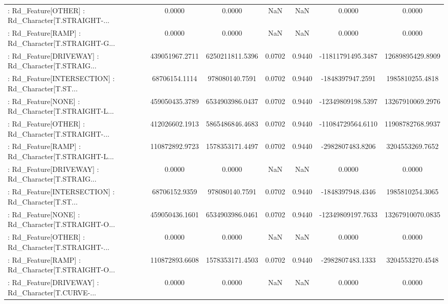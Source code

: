 \begin{longtable}{p{4cm}cccccc}
 : Rd\_Feature[OTHER] : Rd\_Character[T.STRAIGHT-... &            0.0000 &            0.0000 &     NaN &          NaN &             0.0000 &            0.0000 \\
 : Rd\_Feature[RAMP] : Rd\_Character[T.STRAIGHT-G... &            0.0000 &            0.0000 &     NaN &          NaN &             0.0000 &            0.0000 \\
 : Rd\_Feature[DRIVEWAY] : Rd\_Character[T.STRAIG... &    439051967.2711 &   6250211811.5396 &  0.0702 &       0.9440 &  -11811791495.3487 &  12689895429.8909 \\
 : Rd\_Feature[INTERSECTION] : Rd\_Character[T.ST... &     68706154.1114 &    978080140.7591 &  0.0702 &       0.9440 &   -1848397947.2591 &   1985810255.4818 \\
 : Rd\_Feature[NONE] : Rd\_Character[T.STRAIGHT-L... &    459050435.3789 &   6534903986.0437 &  0.0702 &       0.9440 &  -12349809198.5397 &  13267910069.2976 \\
 : Rd\_Feature[OTHER] : Rd\_Character[T.STRAIGHT-... &    412026602.1913 &   5865486846.4683 &  0.0702 &       0.9440 &  -11084729564.6110 &  11908782768.9937 \\
 : Rd\_Feature[RAMP] : Rd\_Character[T.STRAIGHT-L... &    110872892.9723 &   1578353171.4497 &  0.0702 &       0.9440 &   -2982807483.8206 &   3204553269.7652 \\
 : Rd\_Feature[DRIVEWAY] : Rd\_Character[T.STRAIG... &            0.0000 &            0.0000 &     NaN &          NaN &             0.0000 &            0.0000 \\
 : Rd\_Feature[INTERSECTION] : Rd\_Character[T.ST... &     68706152.9359 &    978080140.7591 &  0.0702 &       0.9440 &   -1848397948.4346 &   1985810254.3065 \\
 : Rd\_Feature[NONE] : Rd\_Character[T.STRAIGHT-O... &    459050436.1601 &   6534903986.0461 &  0.0702 &       0.9440 &  -12349809197.7633 &  13267910070.0835 \\
 : Rd\_Feature[OTHER] : Rd\_Character[T.STRAIGHT-... &            0.0000 &            0.0000 &     NaN &          NaN &             0.0000 &            0.0000 \\
 : Rd\_Feature[RAMP] : Rd\_Character[T.STRAIGHT-O... &    110872893.6608 &   1578353171.4503 &  0.0702 &       0.9440 &   -2982807483.1333 &   3204553270.4548 \\
 : Rd\_Feature[DRIVEWAY] : Rd\_Character[T.CURVE-... &            0.0000 &            0.0000 &     NaN &          NaN &             0.0000 &            0.0000 \\

\end{longtable}
